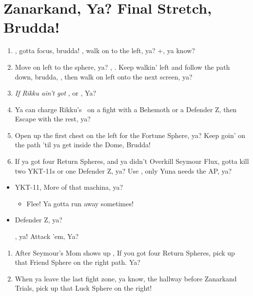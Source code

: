 \chapter{Zanarkand, Ya? Final Stretch, Brudda!}
\begin{enumerate}
\item \sd, gotta focus, brudda! \cs[0:50], walk on to the left, ya? \fmv+\cs[2:20], ya know?
\item Move on left to the sphere, ya? \sd, \cs[1:40]. Keep walkin' left and follow the path down, brudda, \cs[3:20], then walk on left onto the next screen, ya?
\item \textit{If Rikku ain't got \od} \formation{\tidus}{\auron}{\rikku}, or \formation{\tidus}{\auron}{\kimahri}, Ya?
\item Ya can charge Rikku's \od\ on a fight with a Behemoth or a Defender Z, then Escape with the rest, ya?
\item Open up the first chest on the left for the Fortune Sphere, ya? Keep goin' on the path 'til ya get inside the Dome, Brudda!
\item If ya got four Return Spheres, and ya didn't Overkill Seymour Flux, gotta kill two YKT-11s or one Defender Z, ya? Use \formation{\tidus}{\auron}{\yuna}, only Yuna needs the AP, ya?
\end{enumerate}
\begin{encounters}
\begin{itemize}
\item YKT-11, More of that machina, ya?
\begin{itemize}
\yunaf Attack 'em, Yuna!
\tidusf Attack!
\item Flee! Ya gotta run away sometimes!
\end{itemize}
\item Defender Z, ya?
\begin{itemize}
\summon{\bahamut}, ya!
\bahamutf Attack 'em, Ya?
\end{itemize}
\end{itemize}
\end{encounters}
\begin{enumerate}[resume]
\item After Seymour's Mom shows up \cs, If you got four Return Spheres, pick up that Friend Sphere on the right path. Ya?
\item When ya leave the last fight zone, ya know, the hallway before Zanarkand Trials, pick up that Luck Sphere on the right!
\end{enumerate}
